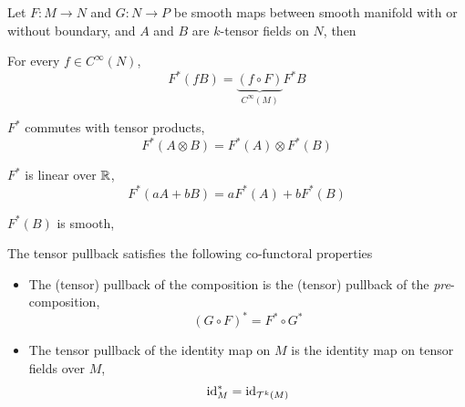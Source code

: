 \documentclass[../main-manifolds.tex]{subfiles}
\begin{document}
\begin{wts}
    Let $F: M\to N$ and $G:N\to P$ be smooth maps between smooth manifold with or without boundary, and $A$ and $B$ are $k$-tensor fields on $N$, then
    \begin{enumroman}
        \item For every $f\in C^\infty(N)$,
        \[
            F^*(fB) = \underbrace{(f\circ F)}_{C^\infty(M)}F^*B
        \]
        \item $F^*$ commutes with tensor products,
        \[
            F^*(A\otimes B) = F^*(A)\otimes F^*(B)
        \]
        \item $F^*$ is linear over $\mathbb{R}$, 
        \[
            F^*(aA + bB) = aF^*(A) + bF^*(B)
        \]
        \item $F^*(B)$ is smooth,
        \item The tensor pullback satisfies the following co-functoral properties
        \begin{itemize}
            \item The (tensor) pullback of the composition is the (tensor) pullback of the \emph{pre}-composition,
            \[
                (G\circ F)^* = F^*\circ G^*
            \]
            \item The tensor pullback of the identity map on $M$ is the identity map on tensor fields over $M$,
            \[
                \operatorname{id}_{M}^* =\operatorname{id}_{\mathcal{T}^k(M)}
            \]
        \end{itemize}
    \end{enumroman}
\end{wts}
\end{document}
